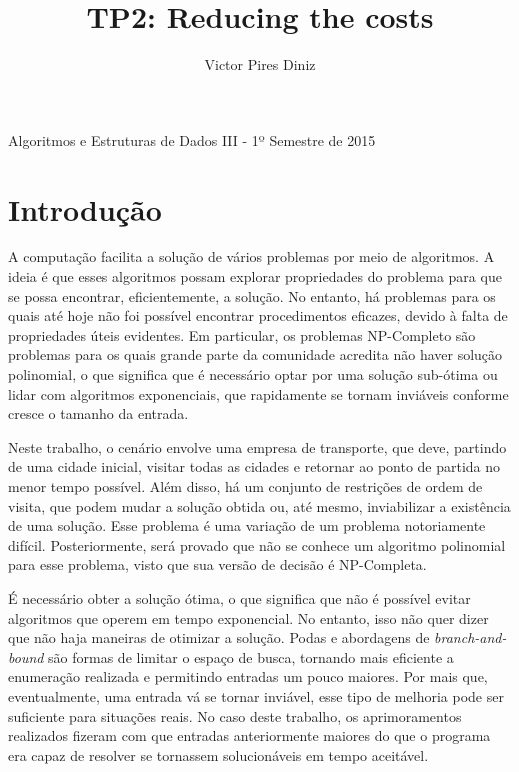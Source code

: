 \documentclass[10pt,a4paper]{article}
\title{TP2: Reducing the costs}
\author{Victor Pires Diniz}
\numberwithin{equation}{section}
\begin{document}
\maketitle
\begin{center}
Algoritmos e Estruturas de Dados III - 1º Semestre de 2015
\end{center}

\section{Introdução}

A computação facilita a solução de vários problemas por meio de algoritmos. A ideia é que esses algoritmos possam explorar propriedades do problema para que se possa encontrar, eficientemente, a solução. No entanto, há problemas para os quais até hoje não foi possível encontrar procedimentos eficazes, devido à falta de propriedades úteis evidentes. Em particular, os problemas NP-Completo são problemas para os quais grande parte da comunidade acredita não haver solução polinomial, o que significa que é necessário optar por uma solução sub-ótima ou lidar com algoritmos exponenciais, que rapidamente se tornam inviáveis conforme cresce o tamanho da entrada.

Neste trabalho, o cenário envolve uma empresa de transporte, que deve, partindo de uma cidade inicial, visitar todas as cidades e retornar ao ponto de partida no menor tempo possível. Além disso, há um conjunto de restrições de ordem de visita, que podem mudar a solução obtida ou, até mesmo, inviabilizar a existência de uma solução. Esse problema é uma variação de um problema notoriamente difícil. Posteriormente, será provado que não se conhece um algoritmo polinomial para esse problema, visto que sua versão de decisão é NP-Completa.

É necessário obter a solução ótima, o que significa que não é possível evitar algoritmos que operem em tempo exponencial. No entanto, isso não quer dizer que não haja maneiras de otimizar a solução. Podas e abordagens de \emph{branch-and-bound} são formas de limitar o espaço de busca, tornando mais eficiente a enumeração realizada e permitindo entradas um pouco maiores. Por mais que, eventualmente, uma entrada vá se tornar inviável, esse tipo de melhoria pode ser suficiente para situações reais. No caso deste trabalho, os aprimoramentos realizados fizeram com que entradas anteriormente maiores do que o programa era capaz de resolver se tornassem solucionáveis em tempo aceitável.
\end{document}
